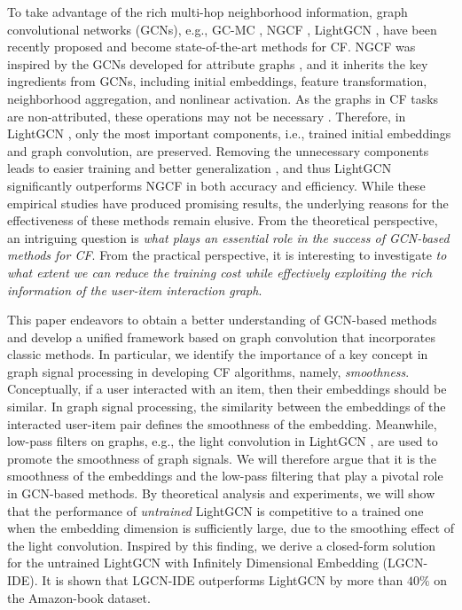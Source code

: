 \documentclass[sigconf]{acmart}
\begin{document}
To take advantage of the rich multi-hop neighborhood information, graph convolutional networks (GCNs), e.g., GC-MC \cite{berg2017graph}, NGCF \cite{wang2019neural}, LightGCN \cite{he2020lightgcn}, have been recently proposed  and become state-of-the-art methods for CF. NGCF \cite{wang2019neural} was inspired by the GCNs developed for attribute graphs \cite{kipf2016semi}, and it inherits the key ingredients from GCNs, including initial embeddings, feature transformation, neighborhood aggregation, and nonlinear activation. As the graphs in CF tasks are non-attributed, these operations may not be necessary \cite{he2020lightgcn}. Therefore, in LightGCN \cite{he2020lightgcn}, only the most important components, i.e., trained initial embeddings and graph convolution, are preserved. Removing the unnecessary components leads to easier training and better generalization \cite{xu2021optimization,xu2020neural}, and thus LightGCN significantly outperforms NGCF in both accuracy and efficiency. While these empirical studies have produced promising results, the underlying reasons for the effectiveness of these methods remain elusive. From the theoretical perspective, an intriguing question is \emph{what plays an essential role in the success of GCN-based methods for CF}. From the practical perspective, it is interesting to investigate \emph{to what extent we can reduce the training cost while effectively exploiting the rich information of the user-item interaction graph}.


This paper endeavors to obtain a better understanding of GCN-based methods and develop a unified framework based on graph convolution that incorporates classic methods. In particular, we identify the importance of a key concept in graph signal processing in developing CF algorithms, namely, \emph{smoothness}. Conceptually, if a user interacted with an item, then  their embeddings should be similar. In graph signal processing, the similarity between the embeddings of the interacted user-item pair defines the smoothness of the embedding. Meanwhile, low-pass filters on graphs, e.g., the light convolution in LightGCN \cite{he2020lightgcn}, are used to promote the smoothness of graph signals. We will therefore argue that it is the smoothness of the embeddings and the low-pass filtering that play a pivotal role in GCN-based methods. By theoretical analysis and experiments, we will show that the performance of \emph{untrained} LightGCN is competitive to a trained one when the embedding dimension is sufficiently large, due to the smoothing effect of the light convolution. Inspired by this finding, we derive a closed-form solution for the untrained LightGCN with Infinitely Dimensional Embedding (LGCN-IDE). It is shown that LGCN-IDE outperforms LightGCN by more than $40\%$ on the Amazon-book dataset.
\end{document}
